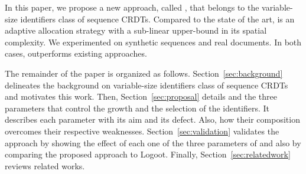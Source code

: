 In this paper, we propose a new approach, called \NAME{}, that belongs to the
variable-size identifiers class of sequence CRDTs. Compared to the state of the
art, \NAME{} is an adaptive allocation strategy with a sub-linear upper-bound
in its spatial complexity. We experimented \NAME{} on synthetic sequences and
real documents. In both cases, \NAME{} outperforms existing approaches.

The remainder of the paper is organized as
follows. Section~\ref{sec:background} delineates the background on
variable-size identifiers class of sequence CRDTs and motivates this
work. Then, Section~\ref{sec:proposal} details \NAME{} and the three parameters
that control the growth and the selection of the identifiers. It describes each
parameter with its aim and its defect. Also, how their composition overcomes
their respective weaknesses. Section~\ref{sec:validation} validates the
approach by showing the effect of each one of the three parameters of \NAME{}
and also by comparing the proposed approach to Logoot. Finally,
Section~\ref{sec:relatedwork} reviews related works.
